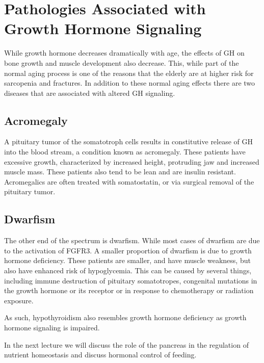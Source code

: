 \documentclass{tufte-handout}
\begin{document}
\section{Pathologies Associated with Growth Hormone Signaling}

While growth hormone decreases dramatically with age, the effects of GH on bone growth and muscle development also decrease.  This, while part of the normal aging process is one of the reasons that the elderly are at higher risk for sarcopenia and fractures.  In addition to these normal aging effects there are two diseases that are associated with altered GH signaling.  

\subsection{Acromegaly}

A pituitary tumor of the somatotroph cells results in constitutive release of GH into the blood stream, a condition known as acromegaly.  These patients have excessive growth, characterized by increased height, protruding jaw and increased muscle mass.  These patients also tend to be lean and are insulin resistant.  Acromegalics are often treated with somatostatin, or via surgical removal of the pituitary tumor.

\subsection{Dwarfism}

The other end of the spectrum is dwarfism.  While most cases of dwarfism are due to the activation of FGFR3\cite{Shiang1994}.  A smaller proportion of dwarfism is due to growth hormone deficiency.  These patients are smaller, and have muscle weakness, but also have enhanced risk of hypoglycemia.  This can be caused by several things, including immune destruction of pituitary somatotropes, congenital mutations in the growth hormone or its receptor or in response to chemotherapy or radiation exposure. 

  As such, hypothyroidism also resembles growth hormone deficiency as growth hormone signaling is impaired.

In the next lecture we will discuss the role of the pancreas in the regulation of nutrient homeostasis and discuss hormonal control of feeding.
\listoffigures
\listoftables



\end{document}
